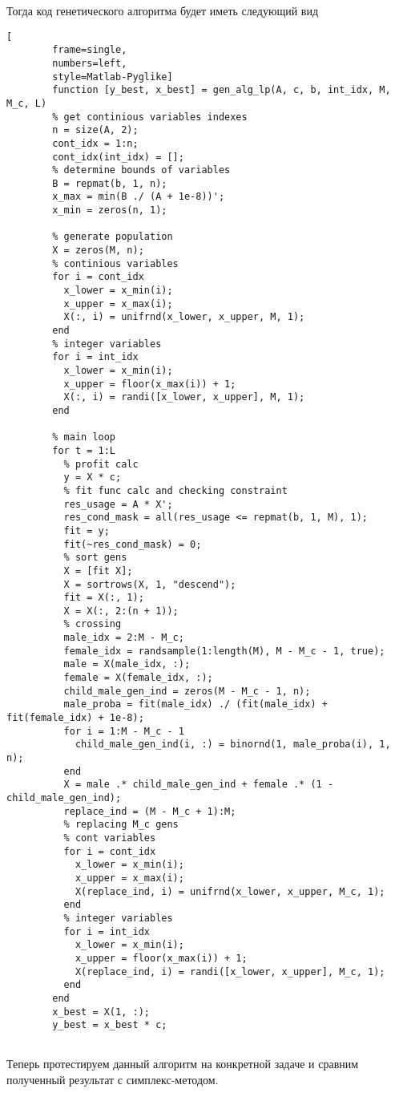 \documentclass[../main.tex]{subfiles}
\begin{document}
 	 Тогда код генетического алгоритма будет иметь следующий вид
 	 
 	 
 	 \begin{lstlisting}[
 	 	frame=single,
 	 	numbers=left,
 	 	style=Matlab-Pyglike]
 	 	function [y_best, x_best] = gen_alg_lp(A, c, b, int_idx, M, M_c, L) 
 	 	% get continious variables indexes
 	 	n = size(A, 2);
 	 	cont_idx = 1:n;
 	 	cont_idx(int_idx) = [];
 	 	% determine bounds of variables
 	 	B = repmat(b, 1, n);
 	 	x_max = min(B ./ (A + 1e-8))';
 	 	x_min = zeros(n, 1);
 	 	
 	 	% generate population
 	 	X = zeros(M, n);
 	 	% continious variables
 	 	for i = cont_idx
 	 	  x_lower = x_min(i);
 	 	  x_upper = x_max(i);
 	 	  X(:, i) = unifrnd(x_lower, x_upper, M, 1);
 	 	end
 	 	% integer variables
 	 	for i = int_idx
 	 	  x_lower = x_min(i);
 	 	  x_upper = floor(x_max(i)) + 1;
 	   	  X(:, i) = randi([x_lower, x_upper], M, 1);
 	 	end
 	 	
 	 	% main loop
 	 	for t = 1:L
 	 	  % profit calc
 	 	  y = X * c;
 	 	  % fit func calc and checking constraint
 	 	  res_usage = A * X';
 	 	  res_cond_mask = all(res_usage <= repmat(b, 1, M), 1);
 	 	  fit = y;
 	 	  fit(~res_cond_mask) = 0;
 	 	  % sort gens
 	 	  X = [fit X];
 	 	  X = sortrows(X, 1, "descend");
 	 	  fit = X(:, 1);
 	 	  X = X(:, 2:(n + 1));
 	 	  % crossing
 	 	  male_idx = 2:M - M_c;
 	 	  female_idx = randsample(1:length(M), M - M_c - 1, true);
 	 	  male = X(male_idx, :);
 	 	  female = X(female_idx, :);
 	 	  child_male_gen_ind = zeros(M - M_c - 1, n);
 	 	  male_proba = fit(male_idx) ./ (fit(male_idx) + fit(female_idx) + 1e-8);
 	 	  for i = 1:M - M_c - 1
 	 	    child_male_gen_ind(i, :) = binornd(1, male_proba(i), 1, n);
 	 	  end
 	 	  X = male .* child_male_gen_ind + female .* (1 - child_male_gen_ind);
 	 	  replace_ind = (M - M_c + 1):M;
 	 	  % replacing M_c gens
 	 	  % cont variables
 	 	  for i = cont_idx
 	 	    x_lower = x_min(i);
 	 	    x_upper = x_max(i);
 	 	    X(replace_ind, i) = unifrnd(x_lower, x_upper, M_c, 1);
 	 	  end
 	 	  % integer variables
 	 	  for i = int_idx
 	 	    x_lower = x_min(i);
 	 	    x_upper = floor(x_max(i)) + 1;
 	 	    X(replace_ind, i) = randi([x_lower, x_upper], M_c, 1);
 	 	  end
 	 	end
 	 	x_best = X(1, :);
 	 	y_best = x_best * c;
 	 	
 	 \end{lstlisting}
 	
	Теперь протестируем данный алгоритм на конкретной задаче и сравним полученный результат с симплекс-методом.
	
\end{document}
